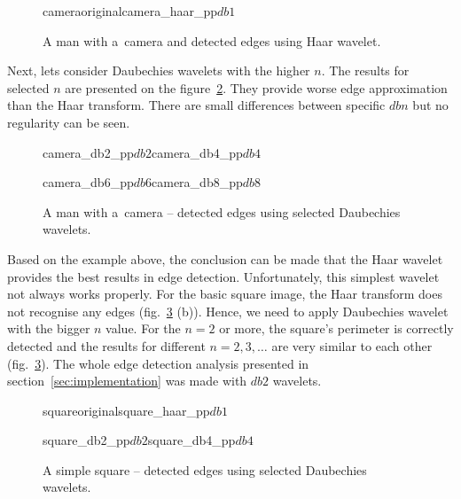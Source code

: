 \begin{figure}[h]
	\centering
	\begin{mainsubdiagrams2}{camera}{original}{camera_haar_pp}{$db1$}
	\end{mainsubdiagrams2}
	
	\caption{A man with a~camera and detected edges using Haar wavelet.}
	\label{fig:camera_haar}
\end{figure}

Next, lets consider Daubechies wavelets with the higher $n$. The results for selected $n$ are presented on the figure~\ref{fig:camera_daubechies}. They provide worse edge approximation than the Haar transform. There are small differences between specific $dbn$ but no regularity can be seen.

\begin{figure}[h]
	\centering
	\begin{mainsubdiagrams2}{camera_db2_pp}{$db2$}{camera_db4_pp}{$db4$}
	\end{mainsubdiagrams2}
	
	\begin{mainsubdiagrams2}{camera_db6_pp}{$db6$}{camera_db8_pp}{$db8$}
	\end{mainsubdiagrams2}
	
	\caption{A man with a~camera -- detected edges using selected Daubechies wavelets.}
	\label{fig:camera_daubechies}
\end{figure}

Based on the example above, the conclusion can be made that the Haar wavelet provides the best results in edge detection. Unfortunately, this simplest wavelet not always works properly. For the basic square image, the Haar transform does not recognise any edges (fig.~\ref{fig:square_daubechies} (b)). Hence, we need to apply Daubechies wavelet with the bigger $n$ value. For the $n=2$ or more, the square's perimeter is correctly detected and the results for different $n=2,3,\ldots$ are very similar to each other (fig.~\ref{fig:square_daubechies}). The whole edge detection analysis presented in section~\ref{sec:implementation} was made with $db2$ wavelets.

\begin{figure}[h]
	\centering
	\begin{subdiagrams2}{square}{original}{square_haar_pp}{$db1$}
	\end{subdiagrams2}
	
	\begin{subdiagrams2}{square_db2_pp}{$db2$}{square_db4_pp}{$db4$}
	\end{subdiagrams2}
	
	\caption{A simple square -- detected edges using selected Daubechies wavelets.}
	\label{fig:square_daubechies}
\end{figure}

